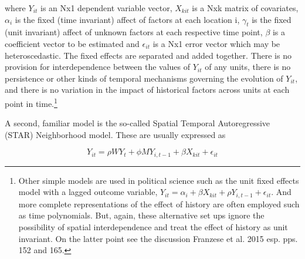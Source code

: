 \documentclass[12pt]{article}
\begin{document}
where $Y_{it}$ is an Nx1 dependent variable vector, $X_{kit}$ is a Nxk matrix of
covariates, $\alpha_i$ is the fixed (time invariant) affect of factors at each location i,
$\gamma_t$ is the fixed (unit invariant) affect of unknown factors at each respective
time point, $\beta$ is a coefficient vector to be estimated and $\epsilon_{it}$ is a Nx1 error
vector which may be heteroscedastic. The fixed effects are separated and added together.
There is no provision for interdependence between the values of $Y_{it}$ of any units,
there is no persistence or other kinds of temporal mechanisms governing the evolution
of $Y_{it}$, and there is no variation in the impact of historical factors across units at each
point in time.\footnote{Other simple models are used in political science such as the unit fixed
effects model with a lagged outcome variable, $Y_{it}= \alpha_i + \beta X_{kit} + \rho Y_{i, t-1} +
\epsilon_{it}$. And more complete representations of the effect of history are often employed
such as time polynomials. But, again, these alternative set ups ignore the possibility of
spatial interdependence and treat the effect of history as unit invariant. On the latter
point see the discussion Franzese et al. 2015 esp. pps. 152 and 165.}

A second, familiar model is the so-called Spatial Temporal Autoregressive (STAR) Neighborhood
model. These are usually expressed as

\begin{equation}
Y_{it} = \rho W Y_{t} + \phi M Y_{i,t-1} + \beta X_{kit} + \epsilon_{it}
\label{equation:star}
\end{equation}
\end{document}
